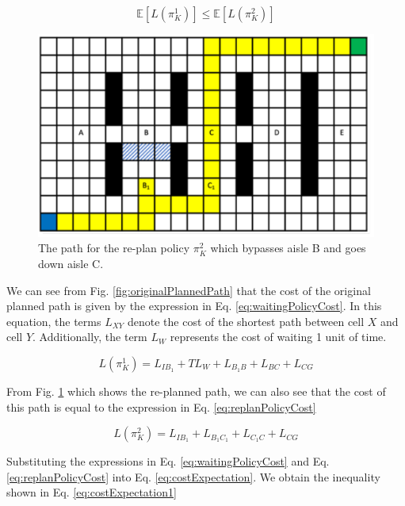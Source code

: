 \documentclass[a4paper,12pt]{article}
\begin{document}
			\begin{equation}
				\mathbb{E}\left[L\left(\pi_{K}^{1}\right)\right] \leq \mathbb{E}\left[L\left(\pi_{K}^{2}\right)\right]
				\label{eq:costExpectation}
			\end{equation}

			\begin{figure}[H]
				\centering
				\includegraphics[scale=0.6]{images/replannedPathAisleB.png}
				\caption{The path for the re-plan policy $\pi_{K}^{2}$ which bypasses aisle B and goes down aisle C.}
				\label{fig:replannedPathAisleB}
			\end{figure}

			We can see from Fig. \ref{fig:originalPlannedPath} that the cost of the original planned path is given by the expression in Eq. \ref{eq:waitingPolicyCost}. In this equation, the terms $L_{XY}$ denote the cost of the shortest path between cell $X$ and cell $Y$. Additionally, the term $L_{W}$ represents the cost of waiting 1 unit of time.
			
			\begin{equation}
				L\left(\pi_{K}^{1}\right) = L_{IB_{1}} + TL_W + L_{B_{1}B} + L_{BC} + L_{CG}
				\label{eq:waitingPolicyCost}
			\end{equation}

			From Fig. \ref{fig:replannedPathAisleB} which shows the re-planned path, we can also see that the cost of this path is equal to the expression in Eq. \ref{eq:replanPolicyCost}

			\begin{equation}
				L\left(\pi_{K}^{2}\right) = L_{IB_{1}} + L_{B_{1}C_{1}} + L_{C_{1}C} + L_{CG}
				\label{eq:replanPolicyCost}
			\end{equation}

			Substituting the expressions in Eq. \ref{eq:waitingPolicyCost} and Eq. \ref{eq:replanPolicyCost} into Eq. \ref{eq:costExpectation}. We obtain the inequality shown in Eq. \ref{eq:costExpectation1}
\end{document}
